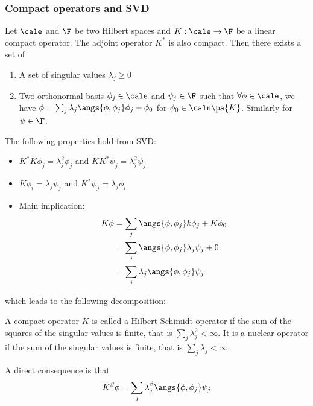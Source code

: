 \subsubsection{Compact operators and SVD}
\begin{definition}
    Let $\cale$ and $\F$ be two Hilbert spaces and $K:\cale\rightarrow\F$ be a linear compact operator. The adjoint operator $K^*$ is also compact. Then there exists a set of
    \begin{enumerate}
        \item A set of singular values $\lambda_j\geq 0$
        \item Two orthonormal basis $\phi_j\in\cale$ and $\psi_j\in\F$ such that $\forall
                  \phi\in\cale$, we have $\phi=\sum_j\lambda_j\angs{\phi,\phi_j}\phi_j+\phi_0$
              for $\phi_0\in \caln\pa{K}$. Similarly for $\psi\in \F$.
    \end{enumerate}
    The following properties hold from SVD:
    \begin{itemize}
        \item $K^*K\phi_j=\lambda_j^2\phi_j$ and $KK^*\psi_j=\lambda_j^2\psi_j$
        \item $K\phi_i=\lambda_j\psi_j$ and $K^*\psi_j=\lambda_j\phi_i$
        \item Main implication: \begin{equation*}
                  \begin{split}
                      K\phi&=\sum_j\angs{\phi,\phi_j}k\phi_j+K\phi_0\\
                      & = \sum_j\angs{\phi,\phi_j}\lambda_j\psi_j+0\\
                      & = \sum_j\lambda_j\angs{\phi,\phi_j}\psi_j
                  \end{split}
              \end{equation*}
    \end{itemize}
    which leads to the following decomposition:
\end{definition}

\begin{definition}
    A compact operator $K$ is called a Hilbert Schimidt operator if the sum of the squares of the singular values is finite, that is $\sum_j\lambda_j^2<\infty$.
    It is a nuclear operator if the sum of the singular values is finite, that is $\sum_j\lambda_j<\infty$.
\end{definition}
A direct consequence is that \begin{equation*}
    K^\beta\phi=\sum_j\lambda_j^\beta\angs{\phi,\phi_j}\psi_j
\end{equation*}

